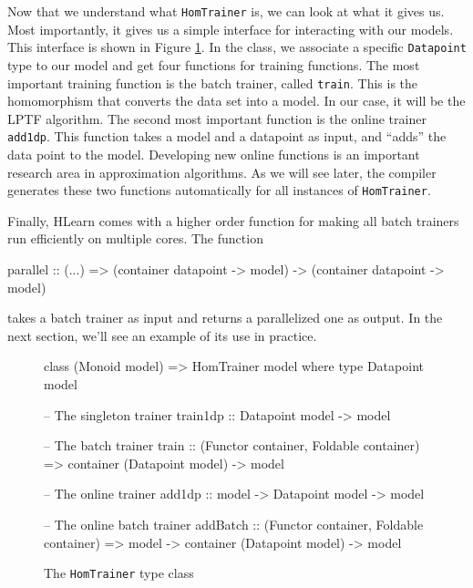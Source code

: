 \documentclass[tikz]{tmr}
\newcommand\h{\lstinline}
\newcommand\+{\mdoubleplus}
\begin{document}
Now that we understand what \h{HomTrainer} is, we can look at what it gives us.
Most importantly, it gives us a simple interface for interacting with our models.
This interface is shown in Figure \ref{alg:HomTrainer}.
In the class, we associate a specific \h{Datapoint} type to our model and get four functions for training functions.
The most important training function is the batch trainer, called \h{train}.
This is the homomorphism that converts the data set into a model.
In our case, it will be the LPTF algorithm.
The second most important function is the online trainer \h{add1dp}.
This function takes a model and a datapoint as input, and ``adds'' the data point to the model.
Developing new online functions is an important research area in approximation algorithms.
As we will see later, the compiler generates these two functions automatically for all instances of \h{HomTrainer}.

Finally, HLearn comes with a higher order function for making all batch trainers run efficiently on multiple cores.
The function
\begin{spec}
parallel :: (...) => 
    (container datapoint -> model) -> (container datapoint -> model)
\end{spec}
takes a batch trainer as input and returns a parallelized one as output.
In the next section, we'll see an example of its use in practice.


\begin{figure}
\caption{The \h{HomTrainer} type class}
\label{alg:HomTrainer}
\begin{code}
class (Monoid model) => HomTrainer model where
    type Datapoint model

    -- The singleton trainer
    train1dp :: Datapoint model -> model
    
    -- The batch trainer
    train :: (Functor container, Foldable container) => 
        container (Datapoint model) -> model

    -- The online trainer
    add1dp :: model -> Datapoint model -> model
    
    -- The online batch trainer
    addBatch :: (Functor container, Foldable container) =>  
        model -> container (Datapoint model) -> model
\end{code}
\end{figure}
\end{document}
